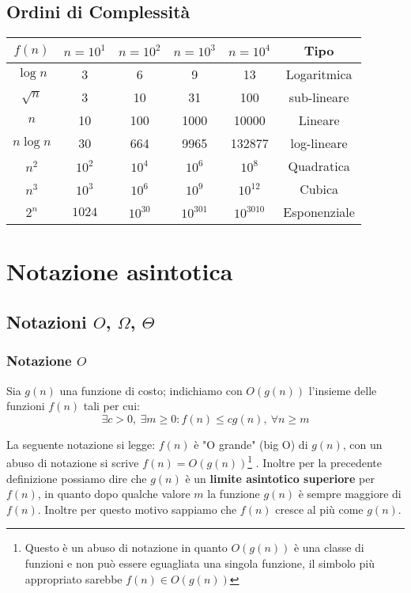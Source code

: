     \subsection{Ordini di Complessità}
        \begin{table}[h]
            \centering
            \begin{tabular}{|c|c|c|c|c|c|}
                \hline
                $ f(n) $ & $ n=10^1 $ & $ n=10^2 $ & $n=10^3 $ & $n=10^4 $ & \textbf{Tipo} \\
                \hline
                $ \log n $ & 3 & 6 & 9 & 13 & Logaritmica \\
                \hline
                $ \sqrt{n} $ & 3 & 10 & 31 & 100 & sub-lineare \\
                \hline
                $ n $ & 10 & 100 & 1000 & 10000 & Lineare \\
                \hline
                $ n\log n $ & 30 & 664 & 9965 & 132877 & log-lineare \\
                \hline
                $ n^2 $ & $10^2$ & $10^4$ & $10^6$ & $10^8$ & Quadratica \\
                \hline
                $ n^3 $ & $10^3$ & $10^6$ & $10^9$ & $10^{12}$ & Cubica \\
                \hline
                $ 2^n $ & $1024$ & $10^{30}$ & $10^{301}$ & $10^{3010}$ & Esponenziale\\
                \hline
            \end{tabular}
        \end{table}
\section{Notazione asintotica}
\label{sec:notazioneAsintotica}
    \subsection{Notazioni \texorpdfstring{$ O $, $ \Omega $, $ \Theta $}{O, Omega, Theta}}
        \subsubsection{Notazione $ O $}
            \begin{definition}
                Sia $ g(n) $ una funzione di costo; indichiamo con $ O(g(n)) $ l'insieme delle funzioni $ f(n) $ tali per cui: 
                $$ \exists c>0,\ \exists m\geq 0: f(n) \leq cg(n),\ \forall n\geq m $$
            \end{definition}
            La seguente notazione si legge: $ f(n) $ è "O grande" (big O) di $ g(n) $, con un abuso di notazione si scrive $ f(n)=O(g(n)) $\footnote{\label{fn:note1} Questo è un abuso di notazione in quanto $ O(g(n)) $ è una classe di funzioni e non può essere eguagliata una singola funzione, il simbolo più appropriato sarebbe $ f(n)\in O(g(n)) $}
            . Inoltre per la precedente definizione possiamo dire che $ g(n) $ è un \textbf{limite asintotico superiore} per $ f(n) $, in quanto dopo qualche valore $ m $ la funzione $ g(n) $ è sempre maggiore di $ f(n) $. Inoltre per questo motivo sappiamo che $ f(n) $ cresce al più come $ g(n) $.

